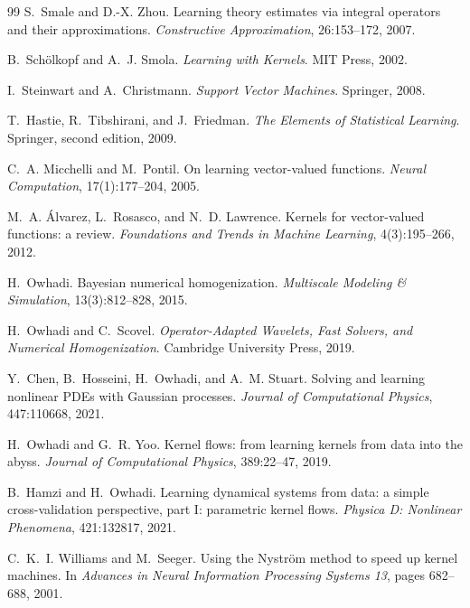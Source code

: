 \begin{thebibliography}{99}
S.~Smale and D.-X. Zhou.
\newblock Learning theory estimates via integral operators and their approximations.
\newblock \emph{Constructive Approximation}, 26:153--172, 2007.

B.~Sch\"olkopf and A.~J. Smola.
\newblock \emph{Learning with Kernels}.
\newblock MIT Press, 2002.

I.~Steinwart and A.~Christmann.
\newblock \emph{Support Vector Machines}.
\newblock Springer, 2008.

T.~Hastie, R.~Tibshirani, and J.~Friedman.
\newblock \emph{The Elements of Statistical Learning}.
\newblock Springer, second edition, 2009.

C.~A. Micchelli and M.~Pontil.
\newblock On learning vector-valued functions.
\newblock \emph{Neural Computation}, 17(1):177--204, 2005.

M.~A. \'Alvarez, L.~Rosasco, and N.~D. Lawrence.
\newblock Kernels for vector-valued functions: a review.
\newblock \emph{Foundations and Trends in Machine Learning}, 4(3):195--266, 2012.

H.~Owhadi.
\newblock Bayesian numerical homogenization.
\newblock \emph{Multiscale Modeling \& Simulation}, 13(3):812--828, 2015.

H.~Owhadi and C.~Scovel.
\newblock \emph{Operator-Adapted Wavelets, Fast Solvers, and Numerical Homogenization}.
\newblock Cambridge University Press, 2019.

Y.~Chen, B.~Hosseini, H.~Owhadi, and A.~M. Stuart.
\newblock Solving and learning nonlinear {PDEs} with {Gaussian} processes.
\newblock \emph{Journal of Computational Physics}, 447:110668, 2021.

H.~Owhadi and G.~R. Yoo.
\newblock Kernel flows: from learning kernels from data into the abyss.
\newblock \emph{Journal of Computational Physics}, 389:22--47, 2019.

B.~Hamzi and H.~Owhadi.
\newblock Learning dynamical systems from data: a simple cross-validation perspective, part I:
parametric kernel flows.
\newblock \emph{Physica D: Nonlinear Phenomena}, 421:132817, 2021.

C.~K.~I. Williams and M.~Seeger.
\newblock Using the {Nystr\"om} method to speed up kernel machines.
\newblock In \emph{Advances in Neural Information Processing Systems 13}, pages 682--688, 2001.


\end{thebibliography}
